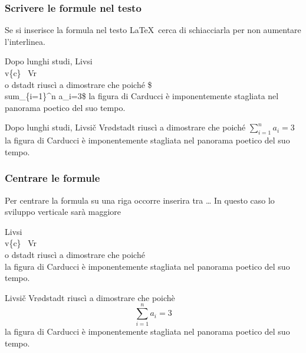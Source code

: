 \begin{frame}
  \frametitle{Scrivere le formule nel testo}
	Se si inserisce la formula nel testo \LaTeX\ cerca di schiacciarla per non aumentare l'interlinea.
	\begin{LaTeXcode}
		Dopo lunghi studi, Livsi\\v\{c\} \ Vr\\o dstadt riusc\`i a dimostrare che poich\'e \alert{\$\\sum\_\{i=1\}\textasciicircum n a\_i=3\$} la figura di Carducci \`e imponentemente stagliata nel panorama poetico del suo tempo.
	\end{LaTeXcode}
	\begin{LaTeXoutput}
		Dopo lunghi studi, Livsi\v{c} Vr\o dstadt riusc\`i a dimostrare che poich\'e $\sum_{i=1}^n a_i=3$ la figura di Carducci \`e imponentemente stagliata nel panorama poetico del suo tempo.
	\end{LaTeXoutput}
\end{frame}
\begin{frame}
  \frametitle{Centrare le formule}
	Per centrare la formula su una riga occorre inserira tra \LCmd[]{\\[}\dots\LCmd[]{\\]} In questo caso lo sviluppo verticale sar\`a maggiore
	\begin{LaTeXcode}
		Livsi\\v\{c\} \ Vr\\o dstadt riusc\`i a dimostrare che poich\'e
		\alert{\\[\\sum\_\{i=1\}\textasciicircum n a\_i\\]} la figura di Carducci \`e imponentemente stagliata nel panorama poetico del suo tempo. 
	\end{LaTeXcode}
	\begin{LaTeXoutput}
		Livsi\v{c} Vr\o dstadt riusc\`i a dimostrare che poich\`e
			\[\sum_{i=1}^n a_i=3\]
		la figura di Carducci \`e imponentemente stagliata nel panorama poetico del suo tempo. 
	\end{LaTeXoutput}
\end{frame}
